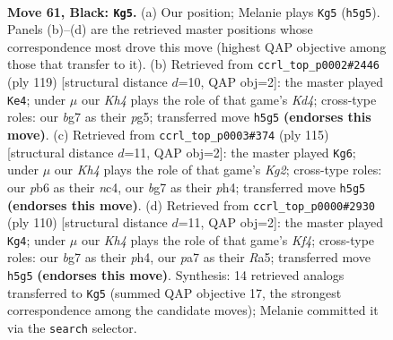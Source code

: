 \documentclass[11pt]{article}
\begin{document}
\clearpage

\begin{figure}[p]\centering
\begin{subfigure}{0.46\textwidth}\centering
\resizebox{\linewidth}{!}{%
\newchessgame
\chessboard[
  setfen={8/P5B1/1P3R2/7k/3K4/8/8/8 b - - 0 61},
  showmover=false,
  pgfstyle=straightmove, color=movearrow, markmove={h5-g5}
]}
\caption{}
\end{subfigure}\hfill
\begin{subfigure}{0.46\textwidth}\centering
\resizebox{\linewidth}{!}{%
\newchessgame
\chessboard[
  setfen={8/8/6R1/3k1pP1/5P2/r7/5K2/8 b - - 0 60},
  showmover=false,
  pgfstyle=straightmove, color=movearrow, markmove={d5-e4}
]}
\caption{}
\end{subfigure}
\\[4pt]
\begin{subfigure}{0.46\textwidth}\centering
\resizebox{\linewidth}{!}{%
\newchessgame
\chessboard[
  setfen={8/6k1/8/7R/2N1K2P/8/8/r7 b - - 2 58},
  showmover=false,
  pgfstyle=straightmove, color=movearrow, markmove={g7-g6}
]}
\caption{}
\end{subfigure}\hfill
\begin{subfigure}{0.46\textwidth}\centering
\resizebox{\linewidth}{!}{%
\newchessgame
\chessboard[
  setfen={6k1/6p1/8/R7/5K1p/7r/8/8 w - - 0 56},
  showmover=false,
  pgfstyle=straightmove, color=movearrow, markmove={f4-g4}
]}
\caption{}
\end{subfigure}
\caption{\textbf{Move 61, Black: \texttt{Kg5}.} (a) Our position; Melanie plays \texttt{Kg5} (\texttt{h5g5}). Panels (b)--(d) are the retrieved master positions whose correspondence most drove this move (highest QAP objective among those that transfer to it). (b) Retrieved from \texttt{ccrl\_top\_p0002\#2446} (ply 119) [structural distance $d$=10, QAP obj=2]: the master played \texttt{Ke4}; under $\mu$ our \emph{Kh4} plays the role of that game's \emph{Kd4}; cross-type roles: our \emph{b}g7 as their \emph{p}g5; transferred move \texttt{h5g5} \textbf{(endorses this move)}. (c) Retrieved from \texttt{ccrl\_top\_p0003\#374} (ply 115) [structural distance $d$=11, QAP obj=2]: the master played \texttt{Kg6}; under $\mu$ our \emph{Kh4} plays the role of that game's \emph{Kg2}; cross-type roles: our \emph{p}b6 as their \emph{n}c4, our \emph{b}g7 as their \emph{p}h4; transferred move \texttt{h5g5} \textbf{(endorses this move)}. (d) Retrieved from \texttt{ccrl\_top\_p0000\#2930} (ply 110) [structural distance $d$=11, QAP obj=2]: the master played \texttt{Kg4}; under $\mu$ our \emph{Kh4} plays the role of that game's \emph{Kf4}; cross-type roles: our \emph{b}g7 as their \emph{p}h4, our \emph{p}a7 as their \emph{R}a5; transferred move \texttt{h5g5} \textbf{(endorses this move)}. Synthesis: 14 retrieved analogs transferred to \texttt{Kg5} (summed QAP objective 17, the strongest correspondence among the candidate moves); Melanie committed it via the \texttt{search} selector.}
\label{fig:thought-m121}
\end{figure}
\end{document}
